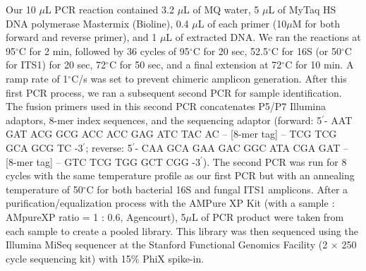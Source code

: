 Our 10 $\mu$L PCR reaction contained 3.2 $\mu$L of MQ water, 5 $\mu$L of MyTaq HS DNA polymerase Mastermix (Bioline), 0.4 $\mu$L of each primer (10$\mu$M for both forward and reverse primer), and 1 $\mu$L of extracted DNA. We ran the reactions at 95$^{\circ}$C for 2 min, followed by 36 cycles of 95$^{\circ}$C for 20 sec, 52.5$^{\circ}$C for 16S (or 50$^{\circ}$C for ITS1) for 20 sec, 72$^{\circ}$C for 50 sec, and a final extension at 72$^{\circ}$C for 10 min. A ramp rate of 1$^{\circ}$C/s was set to prevent chimeric amplicon generation. After this first PCR process, we ran a subsequent second PCR for sample identification. The fusion primers used in this second PCR concatenates P5/P7 Illumina adaptors, 8-mer index sequences, and the sequencing adaptor \citep{Hamady2008} (forward: 5$^\prime$- AAT GAT ACG GCG ACC ACC GAG ATC TAC AC -- [8-mer tag] -- TCG TCG GCA GCG TC -3$^\prime$; reverse: 5$^\prime$- CAA GCA GAA GAC GGC ATA CGA GAT -- [8-mer tag] -- GTC TCG TGG GCT CGG -3$^\prime$). The second PCR was run for 8 cycles with the same temperature profile as our first PCR but with an annealing temperature of 50$^{\circ}$C for both bacterial 16S and fungal ITS1 amplicons. After a purification/equalization process with the AMPure XP Kit (with a sample : AMpureXP ratio = 1 : 0.6, Agencourt), 5$\mu$L of PCR product were taken from each sample to create a pooled library. This library was then sequenced using the Illumina MiSeq sequencer at the Stanford Functional Genomics Facility (2 $\times$ 250 cycle sequencing kit) with 15$\%$ PhiX spike-in.
\par


